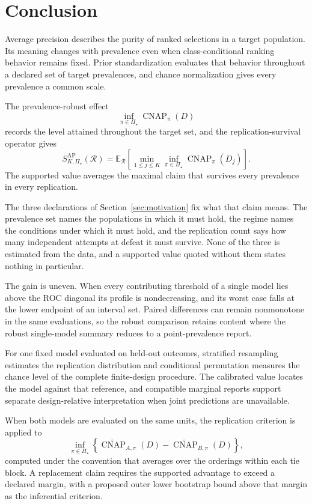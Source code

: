 \documentclass[11pt]{article}
\newcommand{\CNAP}{\operatorname{CNAP}}
\newcommand{\Regime}{\mathcal{R}}
\newcommand{\PSet}{\Pi_\star}
\newcommand{\E}{\mathbb{E}}
\newcommand{\CNAPta}{\widetilde{\CNAP}}
\theoremstyle{remark}
\begin{document}
\section{Conclusion}

Average precision describes the purity of ranked selections in a target population. Its meaning changes with prevalence even when class-conditional ranking behavior remains fixed. Prior standardization evaluates that behavior throughout a declared set of target prevalences, and chance normalization gives every prevalence a common scale.

The prevalence-robust effect
\[
\inf_{\pi\in\PSet}\CNAP_\pi(D)
\]
records the level attained throughout the target set, and the replication-survival operator gives
\[
S_{K,\PSet}^{\mathrm{AP}}(\Regime)
=
\E_{\Regime}
\left[
\min_{1\leq j\leq K}
\inf_{\pi\in\PSet}
\CNAP_\pi(D_j)
\right].
\]
The supported value averages the maximal claim that survives every prevalence in every replication.

The three declarations of Section~\ref{sec:motivation} fix what that claim means. The prevalence set names the populations in which it must hold, the regime names the conditions under which it must hold, and the replication count says how many independent attempts at defeat it must survive. None of the three is estimated from the data, and a supported value quoted without them states nothing in particular.

The gain is uneven. When every contributing threshold of a single model lies above the ROC diagonal its profile is nondecreasing, and its worst case falls at the lower endpoint of an interval set. Paired differences can remain nonmonotone in the same evaluations, so the robust comparison retains content where the robust single-model summary reduces to a point-prevalence report.

For one fixed model evaluated on held-out outcomes, stratified resampling estimates the replication distribution and conditional permutation measures the chance level of the complete finite-design procedure. The calibrated value locates the model against that reference, and compatible marginal reports support separate design-relative interpretation when joint predictions are unavailable.

When both models are evaluated on the same units, the replication criterion is applied to
\[
\inf_{\pi\in\PSet}
\left\{
\CNAPta_{A,\pi}(D)-\CNAPta_{B,\pi}(D)
\right\},
\]
computed under the convention that averages over the orderings within each tie block. A replacement claim requires the supported advantage to exceed a declared margin, with a proposed outer lower bootstrap bound above that margin as the inferential criterion.
\end{document}
